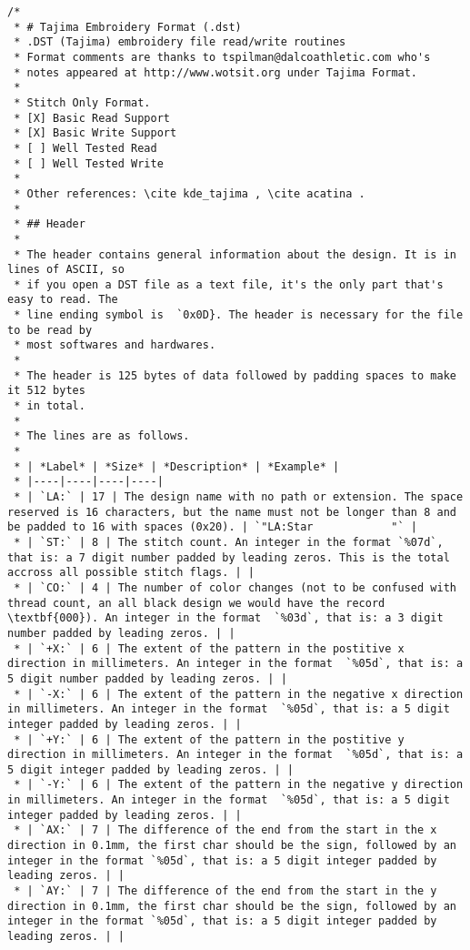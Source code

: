 \begin{lstlisting}
/*
 * # Tajima Embroidery Format (.dst)
 * .DST (Tajima) embroidery file read/write routines
 * Format comments are thanks to tspilman@dalcoathletic.com who's
 * notes appeared at http://www.wotsit.org under Tajima Format.
 *
 * Stitch Only Format.
 * [X] Basic Read Support
 * [X] Basic Write Support
 * [ ] Well Tested Read
 * [ ] Well Tested Write
 *
 * Other references: \cite kde_tajima , \cite acatina .
 *
 * ## Header
 *
 * The header contains general information about the design. It is in lines of ASCII, so
 * if you open a DST file as a text file, it's the only part that's easy to read. The
 * line ending symbol is  `0x0D}. The header is necessary for the file to be read by
 * most softwares and hardwares.
 *
 * The header is 125 bytes of data followed by padding spaces to make it 512 bytes
 * in total.
 *
 * The lines are as follows.
 *
 * | *Label* | *Size* | *Description* | *Example* |
 * |----|----|----|----|
 * | `LA:` | 17 | The design name with no path or extension. The space reserved is 16 characters, but the name must not be longer than 8 and be padded to 16 with spaces (0x20). | `"LA:Star            "` |
 * | `ST:` | 8 | The stitch count. An integer in the format `%07d`, that is: a 7 digit number padded by leading zeros. This is the total accross all possible stitch flags. | |
 * | `CO:` | 4 | The number of color changes (not to be confused with thread count, an all black design we would have the record \textbf{000}). An integer in the format  `%03d`, that is: a 3 digit number padded by leading zeros. | |
 * | `+X:` | 6 | The extent of the pattern in the postitive x direction in millimeters. An integer in the format  `%05d`, that is: a 5 digit number padded by leading zeros. | |
 * | `-X:` | 6 | The extent of the pattern in the negative x direction in millimeters. An integer in the format  `%05d`, that is: a 5 digit integer padded by leading zeros. | |
 * | `+Y:` | 6 | The extent of the pattern in the postitive y direction in millimeters. An integer in the format  `%05d`, that is: a 5 digit integer padded by leading zeros. | |
 * | `-Y:` | 6 | The extent of the pattern in the negative y direction in millimeters. An integer in the format  `%05d`, that is: a 5 digit integer padded by leading zeros. | |
 * | `AX:` | 7 | The difference of the end from the start in the x direction in 0.1mm, the first char should be the sign, followed by an integer in the format `%05d`, that is: a 5 digit integer padded by leading zeros. | |
 * | `AY:` | 7 | The difference of the end from the start in the y direction in 0.1mm, the first char should be the sign, followed by an integer in the format `%05d`, that is: a 5 digit integer padded by leading zeros. | |

\end{lstlisting}
